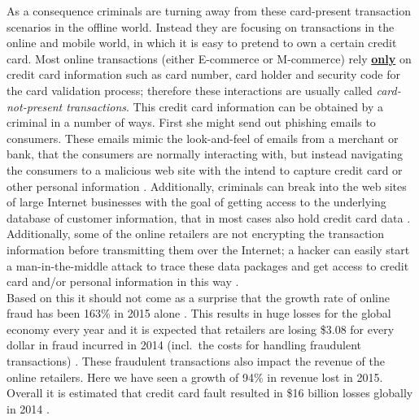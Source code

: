 As a consequence criminals are turning away from these card-present transaction scenarios in the offline world. Instead they are focusing on transactions in the online and mobile world, in which it is easy to pretend to own a certain credit card. Most online transactions (either E-commerce or M-commerce) rely \textbf{\underline{only}} on credit card information such as card number, card holder and security code for the card validation process; therefore these interactions are usually called \textit{card-not-present transactions}. This credit card information can be obtained by a criminal in a number of ways. First she might send out phishing emails to consumers. These emails mimic the look-and-feel of emails from a merchant or bank, that the consumers are normally interacting with, but instead navigating the consumers to a malicious web site with the intend to capture credit card or other personal information \citep{ConsumerAction2009}. Additionally, criminals can break into the web sites of large Internet businesses with the goal of getting access to the underlying database of customer information, that in most cases also hold credit card data \citep{Holmes2015}. Additionally, some of the online retailers are not encrypting the transaction information before transmitting them over the Internet; a hacker can easily start a man-in-the-middle attack to trace these data packages and get access to credit card and/or personal information in this way \citep{Captain2015}. \\

Based on this it should not come as a surprise that the growth rate of online fraud has been 163\% in 2015 alone \citep{PYMNTS2016}. This results in huge losses for the global economy every year and it is expected that retailers are losing \$3.08 for every dollar in fraud incurred in 2014 (incl.\ the costs for handling fraudulent transactions) \citep{Rampton2015}. These fraudulent transactions also impact the revenue of the online retailers. Here we have seen a growth of 94\% in revenue lost in 2015. Overall it is estimated that credit card fault resulted in \$16 billion losses globally in 2014 \citep{PYMNTS2016} \citep{BusinessWire2015}. \\

